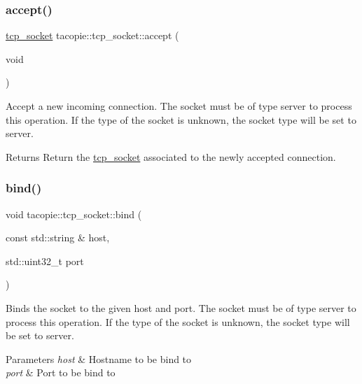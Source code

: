 \subsubsection{\texorpdfstring{accept()}{accept()}}
{\footnotesize\ttfamily \hyperlink{classtacopie_1_1tcp__socket}{tcp\+\_\+socket} tacopie\+::tcp\+\_\+socket\+::accept (\begin{DoxyParamCaption}\item[{void}]{ }\end{DoxyParamCaption})}

Accept a new incoming connection. The socket must be of type server to process this operation. If the type of the socket is unknown, the socket type will be set to server.

\begin{DoxyReturn}{Returns}
Return the \hyperlink{classtacopie_1_1tcp__socket}{tcp\+\_\+socket} associated to the newly accepted connection. 
\end{DoxyReturn}
\mbox{\label{classtacopie_1_1tcp__socket_a910a183d7c45483f1cdacd10a1896155}} 
\subsubsection{\texorpdfstring{bind()}{bind()}}
{\footnotesize\ttfamily void tacopie\+::tcp\+\_\+socket\+::bind (\begin{DoxyParamCaption}\item[{const std\+::string \&}]{host,  }\item[{std\+::uint32\+\_\+t}]{port }\end{DoxyParamCaption})}

Binds the socket to the given host and port. The socket must be of type server to process this operation. If the type of the socket is unknown, the socket type will be set to server.


\begin{DoxyParams}{Parameters}
{\em host} & Hostname to be bind to \\
\hline
{\em port} & Port to be bind to \\
\hline
\end{DoxyParams}
\mbox{\label{classtacopie_1_1tcp__socket_ad5a30b17b1dad9f0ff40305e246a9213}} 
